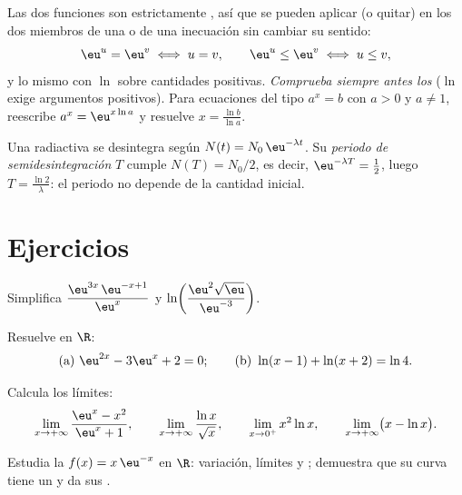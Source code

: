 \begin{method}\label{met:g12:exp:equations}
Las dos funciones son estrictamente , así que se pueden aplicar
(o quitar) en los dos miembros de una  o de una inecuación sin
cambiar su sentido:
\[
\eu^{u} = \eu^{v} \iff u = v, \qquad
\eu^{u} \leq \eu^{v} \iff u \leq v,
\]
y lo mismo con $\ln$ sobre cantidades positivas. \emph{Comprueba siempre
antes los } ($\ln$ exige argumentos positivos). Para ecuaciones del
tipo $a^x = b$ con $a>0$ y $a \neq 1$, reescribe $a^x = \eu^{x\ln a}$ y
resuelve $x = \frac{\ln b}{\ln a}$.
\end{method}

\begin{example}\label{ex:g12:exp:halflife}
Una  radiactiva se desintegra según $N(t) = N_0\,\eu^{-\lambda t}$.
Su \emph{periodo de semidesintegración} $T$ cumple $N(T) = N_0/2$, es
decir, $\eu^{-\lambda T} = \frac12$, luego $T = \frac{\ln 2}{\lambda}$: el
periodo no depende de la cantidad inicial.
\end{example}

\section{Ejercicios}

\begin{exercise}[$\star$]\label{exo:g12:exp:1}
Simplifica $\dfrac{\eu^{3x}\,\eu^{-x+1}}{\eu^{x}}$ y
$\ln\!\left(\dfrac{\eu^2\sqrt{\eu}}{\eu^{-3}}\right)$.
\end{exercise}

\begin{exercise}[$\star$]\label{exo:g12:exp:2}
Resuelve en $\R$:
\[
\text{(a) } \eu^{2x} - 3\eu^{x} + 2 = 0;
\qquad
\text{(b) } \ln(x - 1) + \ln(x + 2) = \ln 4 .
\]
\end{exercise}

\begin{exercise}[$\star$]\label{exo:g12:exp:3}
Calcula los límites:
\[
\lim_{x\to+\infty} \frac{\eu^x - x^2}{\eu^x + 1}, \qquad
\lim_{x\to+\infty} \frac{\ln x}{\sqrt x}, \qquad
\lim_{x\to0^+} x^2 \ln x, \qquad
\lim_{x\to+\infty} \bigl(x - \ln x\bigr).
\]
\end{exercise}

\begin{exercise}[$\star\star$]\label{exo:g12:exp:4}
Estudia la  $f(x) = x\,\eu^{-x}$ en $\R$: variación, límites y
; demuestra que su curva tiene un  y da sus
.
\end{exercise}

